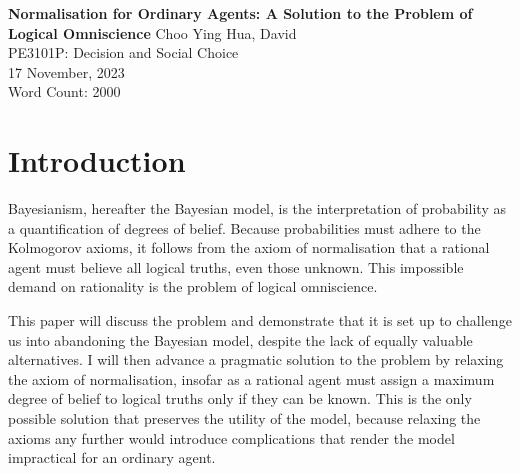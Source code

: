 \documentclass[12pt]{article}
\renewcommand{\maketitle}{%
    \begin{titlepage}
        \begin{center}
            \vfill
            \vspace*{\baselineskip}
            \vfill
            \textbf{Normalisation for Ordinary Agents: A Solution to the Problem of Logical Omniscience}
            \vfill
            Choo Ying Hua, David\\
            PE3101P: Decision and Social Choice\\
            17 November, 2023\\
            Word Count: 2000
            \vfill
        \end{center}
    \end{titlepage}
    }
\begin{document}
\maketitle
\section{Introduction}
Bayesianism, hereafter the Bayesian model, is the interpretation of probability as a quantification of degrees of belief. Because probabilities must adhere to the Kolmogorov axioms, it follows from the axiom of normalisation that a rational agent must believe all logical truths, even those unknown. This impossible demand on rationality is the problem of logical omniscience.

This paper will discuss the problem and demonstrate that it is set up to challenge us into abandoning the Bayesian model, despite the lack of equally valuable alternatives. I will then advance a pragmatic solution to the problem by relaxing the axiom of normalisation, insofar as a rational agent must assign a maximum degree of belief to logical truths only if they can be known. This is the only possible solution that preserves the utility of the model, because relaxing the axioms any further would introduce complications that render the model impractical for an ordinary agent.
\end{document}
